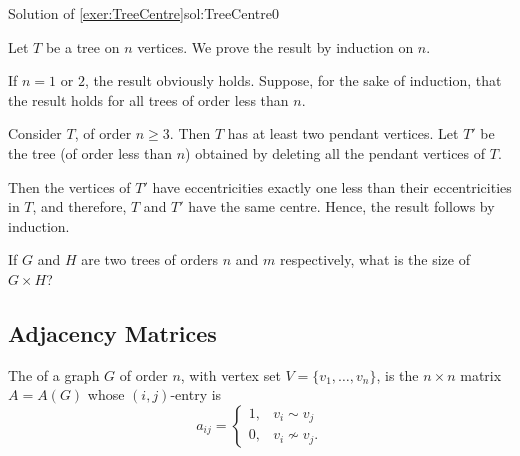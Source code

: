 \begin{Solution*} \begin{ocg}{Solution of \ref{exer:TreeCentre}}{sol:TreeCentre}{0}

\noindent Let $T$ be a tree on $n$ vertices. We prove the result by induction on $n$.

If $n = 1$ or $2$, the result obviously holds. Suppose, for the sake of induction, that the result holds for all trees of order less than $n$.

Consider $T$, of order $n \ge 3$. Then $T$ has at least two pendant vertices. Let $T'$ be the tree (of order less than $n$) obtained by deleting all the pendant vertices of $T$.

Then the vertices of $T'$ have eccentricities exactly one less than their eccentricities in $T$, and therefore, $T$ and $T'$ have the same centre. Hence, the result follows by induction.
\end{ocg}
\end{Solution*}

\begin{Exercise}
If $G$ and $H$ are two trees of orders $n$ and $m$ respectively, what is the size of $G \times H$?
\end{Exercise}

\subsection{Adjacency Matrices}\label{subsec:AdjMat}

The  of a graph $G$ of order $n$, with vertex set $V = \{v_1, \ldots, v_n\}$, is the $n \times n$ matrix $A = A(G)$ whose $(i,j)$-entry is
\begin{equation*}
a_{ij} = \begin{cases}
1, & v_i \sim v_j \\
0, & v_i \nsim v_j.
\end{cases}
\end{equation*}


